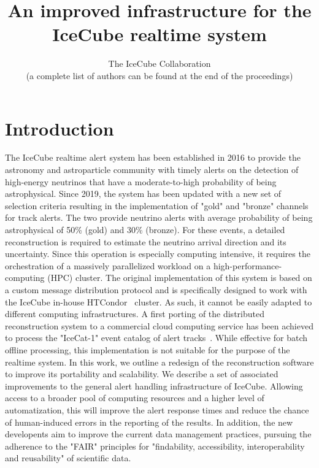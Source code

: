 \documentclass[a4paper,11pt]{article}
\title{An improved infrastructure for the IceCube realtime system}
\author{The IceCube Collaboration \\{\normalsize \normalfont(a complete list of authors can be found at the end of the proceedings)}\\}
\begin{document}
\maketitle


\section{Introduction}
\label{s:intro}

The IceCube realtime alert system has been established in 2016 to provide the astronomy and astroparticle community with timely alerts on the detection of high-energy neutrinos that have a moderate-to-high probability of being astrophysical. Since 2019, the system has been updated with a new set of selection criteria resulting in the implementation of "gold" and "bronze" channels for track alerts. The two provide neutrino alerts with average probability of being astrophysical of 50\% (gold) and 30\% (bronze). For these events, a detailed reconstruction is required to estimate the neutrino arrival direction and its uncertainty. Since this operation is especially computing intensive, it requires the orchestration of a massively parallelized workload on a high-performance-computing (HPC) cluster. The original implementation of this system is based on a custom message distribution protocol and is specifically designed to work with the IceCube in-house HTCondor~\cite{condor-practice} cluster. As such, it cannot be easily adapted to different computing infrastructures. A first porting of the distributed reconstruction system to a commercial cloud computing service has been achieved to process the "IceCat-1" event catalog of alert tracks~\cite{IceCube:2023agq, DVN/SCRUCD_2023}. While effective for batch offline processing, this implementation is not suitable for the purpose of the realtime system. In this work, we outline a redesign of the reconstruction software to improve its portability and scalability. We describe a set of associated improvements to the general alert handling infrastructure of IceCube. Allowing access to a broader pool of computing resources and a higher level of automatization, this will improve the alert response times and reduce the chance of human-induced errors in the reporting of the results. In addition, the new developents aim to improve the current data management practices, pursuing the adherence to the "FAIR" principles for "findability, accessibility, interoperability and reusability" of scientific data.
\end{document}
